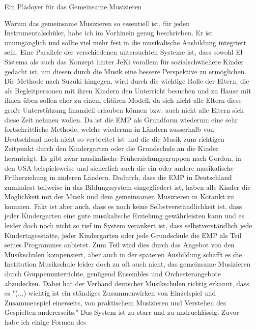 Ein Plädoyer für das Gemeinsame Musizieren

Warum das gemeinsame Musizieren so essentiell ist, für jeden
Instrumentalschüler, habe ich im Vorhinein genug beschrieben. Er ist
unumgänglich und sollte viel mehr fest in die musikalische Ausbildung integriert
sein. 
Eine Parallele der verschiedenen untersuchten Systeme ist, dass sowohl El Sistema als auch das Konzept hinter JeKi vorallem
für sozialschwächere Kinder gedacht ist, um diesen durch die Musik eine bessere
Perspektive zu ermöglichen. Die Methode nach Suzuki hingegen, wird durch die
wichtige Rolle der Eltern, die als Begleitpersonen mit ihren Kindern den
Unterricht besuchen und zu Hause mit ihnen üben sollen eher zu einem elitären
Modell, da sich nicht alle Eltern diese große Unterstützung finanziell erlauben
können bzw. auch nicht alle Eltern sich diese Zeit nehmen wollen. 
Da ist die EMP als Grundform wiederum eine sehr fortschrittliche Methode, welche
wiederum in Ländern ausserhalb von Deutschland noch nicht so verbreitet ist und die die Musik zum
richtigen Zeitpunkt durch den Kindergarten oder die Grundschule an die Kinder
heranträgt. Es gibt zwar musikalische Früherziehungsgruppen nach Gordon, in den
USA beispielsweise und sicherlich auch die ein oder andere musikalische
Früherziehung in anderen Ländern. Dadurch, dass die EMP in Deutschland zumindest teilweise in das Bildungssystem
eingegliedert ist, haben
alle Kinder die Möglichkeit mit der Musik und dem gemeinsamen Musizieren in
Kotankt zu kommen. Fakt ist aber auch, dass es noch keine Selbstverständlichkeit
ist, dass jeder Kindergarten eine gute musikalische Erziehung gewährleisten kann
und es leider doch noch nicht so tief im System verankert ist, dass
selbstverständlich jede Kindertagesstätte, jeder Kindergarten oder jede Grundschule die EMP als Teil seines Programmes
anbietet. Zum Teil wird dies durch das Angebot von den Musikschulen kompensiert,
aber auch in der späteren Ausbildung schafft es die Institution Musikschule
leider doch zu oft auch nicht, das gemeinsame Musizieren durch
Gruppenunterrichte, genügend Ensembles und Orchesterangebote abzudecken. Dabei
hat der Verband deutscher Musikschulen richtig erkannt, dass es "(...)
wichtig ist ein ständiges Zusammenwirken von Einzelspiel und Zusammenspiel
einerseits, von praktischem Musizieren und Verstehen des Gespielten
andererseits." \autocite[22]{losert:die_kunst_zu_unterrichten}
Das System ist zu starr und zu undruchlässig. Zuvor habe ich einige Formen des
